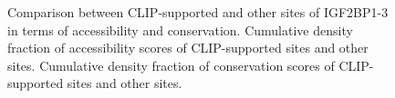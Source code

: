 \begin{figure}[H]
	\centering
\quad
\caption[Accessibility and conservation scores of IGF2BP1-3 protein]{Comparison between CLIP-supported and other sites of IGF2BP1-3 in terms of accessibility and conservation.  Cumulative density fraction of accessibility scores of CLIP-supported sites and other sites.  Cumulative density fraction of conservation scores of CLIP-supported sites and other sites.}
\label{IGF2BP_accessibility_and_conserv}
\end{figure}


